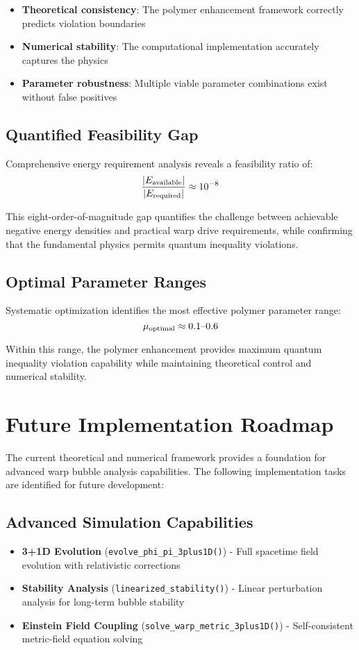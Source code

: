 \documentclass[11pt]{article}
\begin{document}
\begin{itemize}
\item \textbf{Theoretical consistency}: The polymer enhancement framework correctly predicts violation boundaries
\item \textbf{Numerical stability}: The computational implementation accurately captures the physics
\item \textbf{Parameter robustness}: Multiple viable parameter combinations exist without false positives
\end{itemize}

\subsection{Quantified Feasibility Gap}
Comprehensive energy requirement analysis reveals a feasibility ratio of:
\begin{equation}
\frac{|E_{\rm available}|}{|E_{\rm required}|} \approx 10^{-8}
\end{equation}

This eight-order-of-magnitude gap quantifies the challenge between achievable negative energy densities and practical warp drive requirements, while confirming that the fundamental physics permits quantum inequality violations.

\subsection{Optimal Parameter Ranges}
Systematic optimization identifies the most effective polymer parameter range:
\begin{equation}
\mu_{\rm optimal} \approx 0.1 \text{--} 0.6
\end{equation}

Within this range, the polymer enhancement provides maximum quantum inequality violation capability while maintaining theoretical control and numerical stability.

\section{Future Implementation Roadmap}

The current theoretical and numerical framework provides a foundation for advanced warp bubble analysis capabilities. The following implementation tasks are identified for future development:

\subsection{Advanced Simulation Capabilities}
\begin{itemize}
\item \textbf{3+1D Evolution} (\texttt{evolve\_phi\_pi\_3plus1D()}) - Full spacetime field evolution with relativistic corrections
\item \textbf{Stability Analysis} (\texttt{linearized\_stability()}) - Linear perturbation analysis for long-term bubble stability
\item \textbf{Einstein Field Coupling} (\texttt{solve\_warp\_metric\_3plus1D()}) - Self-consistent metric-field equation solving
\end{itemize}
\end{document}
